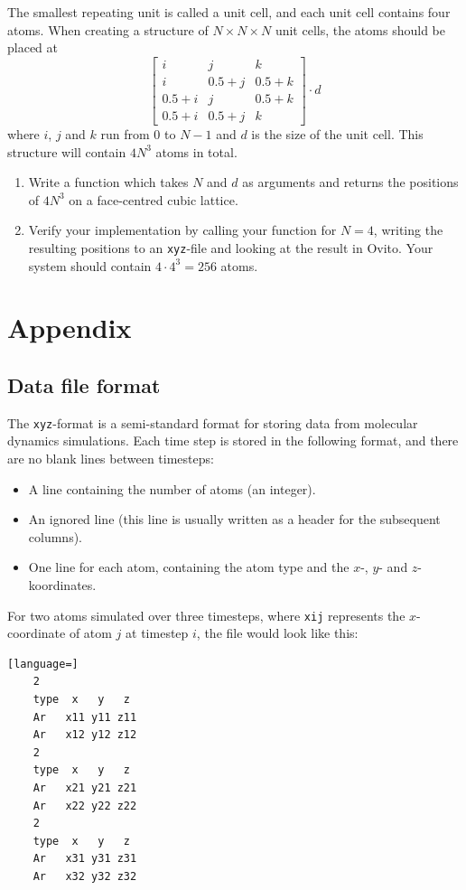 \documentclass[11pt,british,a4paper]{report}
\renewcommand{\thesubsection}{\arabic{section}\alph{subsection})}
\begin{document}
The smallest repeating unit is called a unit cell, and each unit cell contains four atoms. When creating a structure of \(N\times N\times N\) unit cells, the atoms should be placed at
\[
    \begin{bmatrix}
        i & j & k \\
        i & 0.5+j & 0.5+k \\
        0.5+i & j & 0.5+k \\
        0.5+i & 0.5+j & k
    \end{bmatrix}\cdot d
\]
where \(i\), \(j\) and \(k\) run from \(0\) to \(N-1\) and \(d\) is the size of the unit cell. This structure will contain \(4N^3\) atoms in total.
\begin{enumerate}[label=\roman*.]
    \item Write a function which takes \(N\) and \(d\) as arguments and returns the positions of \(4N^3\) on a face-centred cubic lattice.
    \item Verify your implementation by calling your function for \(N=4\), writing the resulting positions to an \texttt{xyz}-file and looking at the result in Ovito. Your system should contain \(4\cdot4^3=256\) atoms.
\end{enumerate}




\appendix
\section*{Appendix}
\setcounter{subsection}{0}
\renewcommand{\thesubsection}{\Alph{subsection}}

\subsection{Data file format}\label{app:xyz}
The \texttt{xyz}-format is a semi-standard format for storing data from molecular dynamics simulations. Each time step is stored in the following format, and there are no blank lines between timesteps:
\begin{itemize}
    \item A line containing the number of atoms (an integer).
    \item An ignored line (this line is usually written as a header for the subsequent columns).
    \item One line for each atom, containing the atom type and the \(x\)-, \(y\)- and \(z\)-koordinates.
\end{itemize}
For two atoms simulated over three timesteps, where \texttt{xij} represents the \(x\)-coordinate of atom \(j\) at timestep \(i\), the file would look like this:
\begin{lstlisting}[language=]
    2
    type  x   y   z
    Ar   x11 y11 z11
    Ar   x12 y12 z12
    2
    type  x   y   z
    Ar   x21 y21 z21
    Ar   x22 y22 z22
    2
    type  x   y   z
    Ar   x31 y31 z31
    Ar   x32 y32 z32
\end{lstlisting}
\end{document}

